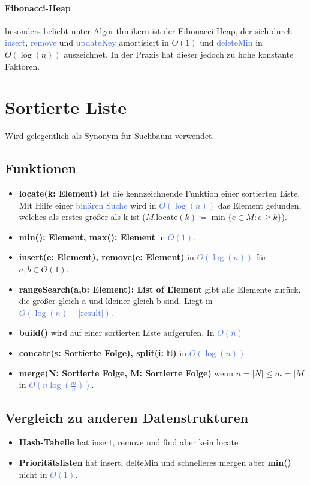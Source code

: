 \documentclass[11pt]{article}
\def \texcol{RoyalBlue}
\begin{document}
\paragraph{Fibonacci-Heap}
besonders beliebt unter Algorithmikern ist der Fibonacci-Heap, der sich durch \textcolor{\texcol}{insert}, \textcolor{\texcol}{remove} und \textcolor{\texcol}{updateKey} amortisiert in $O(1)$ und \textcolor{\texcol}{deleteMin} in $O(\log(n))$ auszeichnet. In der Praxis hat dieser jedoch zu hohe konstante Faktoren.

\section{Sortierte Liste}

Wird gelegentlich als Synonym für Suchbaum verwendet.

\subsection{Funktionen}
\begin{itemize}
\item \textbf{locate(k: Element)} Ist die kennzeichnende Funktion einer sortierten Liste. Mit Hilfe einer \textcolor{\texcol}{binären Suche} wird in \textcolor{\texcol}{$O(\log(n))$} das Element gefunden, welches als erstes größer als k ist ($M$.locate$(k)\coloneqq \min\{e\in M\colon e\geq k\}$).
\item \textbf{min(): Element, max(): Element} in \textcolor{\texcol}{$O(1)$}.
\item \textbf{insert(e: Element), remove(e: Element)} in \textcolor{\texcol}{$O(\log(n))$} für $a,b \in O(1)$.
\item \textbf{rangeSearch(a,b: Element): List of Element} gibt alle Elemente zurück, die größer gleich a und kleiner gleich b sind. Liegt in \textcolor{\texcol}{$O(\log(n)+|\text{result}|)$}.
\item \textbf{build()} wird auf einer sortierten Liste aufgerufen. In \textcolor{\texcol}{$O(n)$}
\item \textbf{concate(s: Sortierte Folge), split(i: $\mathbb{N}$)} in \textcolor{\texcol}{$O(\log(n))$}
\item \textbf{merge(N: Sortierte Folge, M: Sortierte Folge)} wenn $n=|N|\leq m=|M|$ in \textcolor{\texcol}{$O(n\log(\frac{m}{n}))$}.
\end{itemize}

\subsection{Vergleich zu anderen Datenstrukturen}
\begin{itemize}
\item \textbf{Hash-Tabelle} hat insert, remove und find aber kein locate
\item \textbf{Prioritätslisten} hat insert, delteMin und schnelleres mergen aber \textbf{min()} nicht in \textcolor{\texcol}{$O(1)$}.
\end{itemize}
\end{document}
